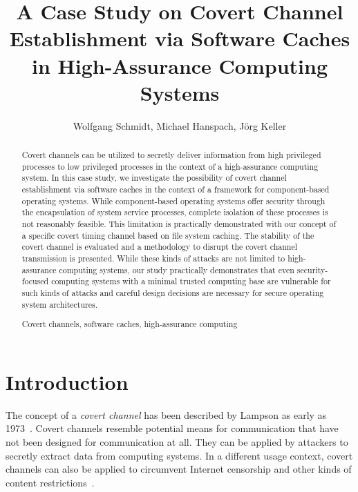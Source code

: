 \documentclass[runningheads,a4paper]{llncs}
\newcommand{\keywords}[1]{\par\addvspace\baselineskip
\noindent\keywordname\enspace\ignorespaces#1}
\begin{document}
\mainmatter  

\title{A Case Study on Covert Channel Establishment via Software Caches in High-Assurance Computing Systems}


\author{Wolfgang Schmidt, Michael Hanspach, J{\"o}rg Keller}





\maketitle

\begin{abstract}
Covert channels can be utilized to secretly deliver information from high privileged processes to low privileged processes in the context of a high-assurance computing system.
In this case study, we investigate the possibility of covert channel establishment via software caches in the context of a framework for component-based operating systems.
While component-based operating systems offer security through the encapsulation of system service processes, complete isolation of these processes is not reasonably feasible.
This limitation is practically demonstrated with our concept of a specific covert timing channel based on file system caching.
The stability of the covert channel is evaluated and a methodology to disrupt the covert channel transmission is presented.
While these kinds of attacks are not limited to high-assurance computing systems, our study practically demonstrates that even security-focused computing systems with a minimal trusted computing base are vulnerable for such kinds of attacks and careful design decisions are necessary for secure operating system architectures.

\keywords{Covert channels, software caches, high-assurance computing}
\end{abstract}

\section{Introduction}\label{sec1}

The concept of a \emph{covert channel} has been described by Lampson as early as 1973~\cite{lampson:1973:ncp:362375.362389}.
Covert channels resemble potential means for communication that have not been designed for communication at all.
They can be applied by attackers to secretly extract data from computing systems.
In a different usage context, covert channels can also be applied to circumvent Internet censorship and other kinds of content restrictions~\cite{Feamster:2002:ICW:647253.720281}.
\end{document}
